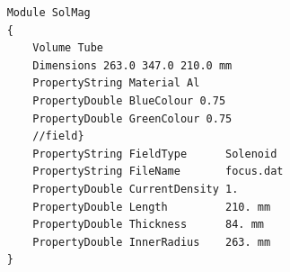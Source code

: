 \begin{verbatim}
    Module SolMag
    {
        Volume Tube
        Dimensions 263.0 347.0 210.0 mm
        PropertyString Material Al
        PropertyDouble BlueColour 0.75
        PropertyDouble GreenColour 0.75
        //field}
        PropertyString FieldType      Solenoid
        PropertyString FileName       focus.dat
        PropertyDouble CurrentDensity 1.
        PropertyDouble Length         210. mm
        PropertyDouble Thickness      84. mm
        PropertyDouble InnerRadius    263. mm
    }
\end{verbatim}
